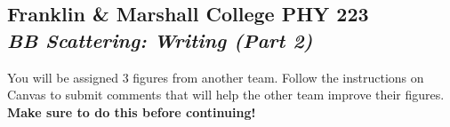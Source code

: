 \documentclass[11pt]{article}
\begin{document}
\begin{center}
\section*{
Franklin \& Marshall College \hfill PHY 223\\
\bigskip
{\Large \it BB Scattering: Writing  (Part 2)}}
\end{center}



\vspace{3mm}

You will be assigned 3 figures from another team. Follow the instructions on Canvas to submit comments that will help the other team improve their figures. \textbf{Make sure to do this before continuing!}




\end{document}
